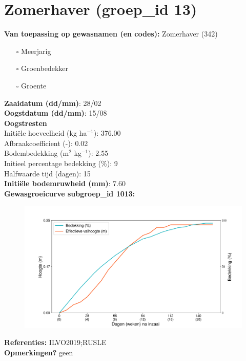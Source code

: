 \documentclass{article}
\begin{document}
 \section{Zomerhaver (groep\_id 13)} 
 \textbf{Van toepassing op gewasnamen (en codes):} Zomerhaver (342) 
 \begin{multicols}{3} \begin{itemize} \item[$\square$] Meerjarig \item[$\square$] Groenbedekker \item[$\square$] Groente \end{itemize} \end{multicols} 
  \textbf{Zaaidatum (dd/mm)}: 28/02  \vspace{0.10cm} \\ 
  \textbf{Oogstdatum (dd/mm)}: 15/08  \vspace{0.10cm} \\ 
  \textbf{Oogstresten} \vspace{0.05cm} \\ 
  \tab Initi\"{e}le hoeveelheid (kg ha$^{-1}$): 376.00 \vspace{0.05cm} \\ 
  \tab Afbraakcoefficient (-): 0.02 \vspace{0.05cm} \\ 
  \tab Bodembedekking (m$^2$ kg$^{-1}$): 2.55 \vspace{0.05cm} \\ 
  \tab Initieel percentage bedekking (\%): 9 \vspace{0.05cm} \\ 
  \tab Halfwaarde tijd (dagen): 15 \vspace{0.05cm} \\ 
  \textbf{Initi\"{e}le bodemruwheid (mm)}: 7.60 \vspace{0.05cm} \\ 
  \textbf{Gewasgroeicurve subgroep\_id 1013:} 
 \begin{center} \begin{figure}[H] \includegraphics[width=12.5cm]{temp/1013.png} \end{figure} \end{center} 
  \textbf{Referenties:} ILVO2019;RUSLE \vspace{0.10cm} \\ 
  \textbf{Opmerkingen?} geen \vspace{0.10cm} \\ 
 \newpage 
\end{document}

